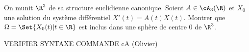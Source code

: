 \begin{enonce}
\begin{exercise}[ID={RMS134 E981},subtitle={Mines-Ponts PSI
    2023},tags={oraux}, concours=mines-ponts, annee=2023, filiere=PSI,
  theme=analyse]

  On munit $\R^3$ de sa structure euclidienne canonique.
  Soient $A\in\cA_3(\R)$ et $X_0$ une solution du système différentiel $X'(t) = A(t) X(t)$.
  Montrer que $\Omega = \Set{X_0(t) | t\in\R}$ est inclus dans une
  sphère de centre $0$ de $\R^3$.

  VERIFIER SYNTAXE COMMANDE cA (Olivier)
\end{exercise}
\begin{solution}
\end{solution}
\end{enonce}
